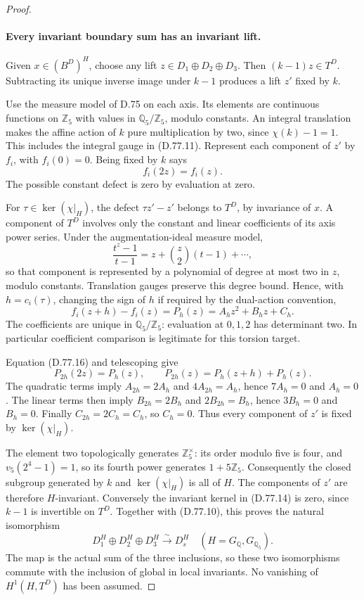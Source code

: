 \begin{proof}
\paragraph{Every invariant boundary sum has an invariant lift.}
Given \(x\in(B^D)^H\), choose any lift
\(z\in D_1\oplus D_2\oplus D_3\). Then \((k-1)z\in T^D\).
Subtracting its unique inverse image under \(k-1\) produces
a lift \(z'\) fixed by \(k\).

Use the measure model of D.75 on each axis. Its elements are
continuous functions on \(\mathbb Z_5\) with values in
\(\mathbb Q_5/\mathbb Z_5\), modulo constants. An integral
translation makes the affine action of \(k\) pure multiplication
by two, since \(\chi(k)-1=1\). This includes the integral gauge
in (D.77.11). Represent each component of \(z'\) by \(f_i\),
with \(f_i(0)=0\). Being fixed by \(k\) says
\[
                              f_i(2z)=f_i(z).           \tag{D.77.16}
\]
The possible constant defect is zero by evaluation at zero.

For \(\tau\in\ker(\chi|_H)\), the defect \(\tau z'-z'\)
belongs to \(T^D\), by invariance of \(x\). A component of \(T^D\)
involves only the constant and linear coefficients of its axis
power series. Under the augmentation-ideal measure model,
\[
 \frac{t^z-1}{t-1}=z+\binom z2(t-1)+\cdots,
\]
so that component is represented by a polynomial of degree at
most two in \(z\), modulo constants. Translation gauges preserve
this degree bound. Hence, with \(h=c_i(\tau)\), changing the sign
of \(h\) if required by the dual-action convention,
\[
 f_i(z+h)-f_i(z)=P_h(z)=A_hz^2+B_hz+C_h.                 \tag{D.77.17}
\]
The coefficients are unique in \(\mathbb Q_5/\mathbb Z_5\):
evaluation at \(0,1,2\) has determinant two. In particular
coefficient comparison is legitimate for this torsion target.

Equation (D.77.16) and telescoping give
\[
 P_{2h}(2z)=P_h(z),\qquad P_{2h}(z)=P_h(z+h)+P_h(z).
\]
The quadratic terms imply \(A_{2h}=2A_h\) and
\(4A_{2h}=A_h\), hence \(7A_h=0\) and \(A_h=0\).
The linear terms then imply \(B_{2h}=2B_h\) and
\(2B_{2h}=B_h\), hence \(3B_h=0\) and \(B_h=0\).
Finally \(C_{2h}=2C_h=C_h\), so \(C_h=0\).
Thus every component of \(z'\) is fixed by \(\ker(\chi|_H)\).

The element two topologically generates \(\mathbb Z_5^\times\):
its order modulo five is four, and \(v_5(2^4-1)=1\), so its
fourth power generates \(1+5\mathbb Z_5\).
Consequently the closed subgroup generated by \(k\) and
\(\ker(\chi|_H)\) is all of \(H\). The components of \(z'\)
are therefore \(H\)-invariant. Conversely the invariant kernel
in (D.77.14) is zero, since \(k-1\) is invertible on \(T^D\).
Together with (D.77.10), this proves the natural isomorphism
\[
 D_1^H\oplus D_2^H\oplus D_3^H
                  \xrightarrow{\ \sim\ }D_s^H
       \quad(H=G_{\mathbb Q},G_{\mathbb Q_5}).           \tag{D.77.18}
\]
The map is the actual sum of the three inclusions, so these two
isomorphisms commute with the inclusion of global in local
invariants. No vanishing of \(H^1(H,T^D)\) has been assumed.


\end{proof}

